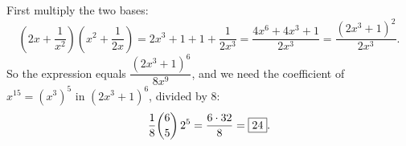 First multiply the two bases:
\[\left(2x+\dfrac{1}{x^2}\right)\left(x^2+\dfrac{1}{2x}\right)=2x^3+1+1+\dfrac{1}{2x^3}=\dfrac{4x^6+4x^3+1}{2x^3}=\dfrac{\left(2x^3+1\right)^2}{2x^3}.\]
So the expression equals $\dfrac{\left(2x^3+1\right)^6}{8x^9}$, and we need the coefficient of $x^{15}=\left(x^3\right)^5$ in $\left(2x^3+1\right)^6$, divided by $8$:
\[\dfrac{1}{8}\dbinom65\,2^5=\dfrac{6\cdot32}{8}=\boxed{24}.\]
